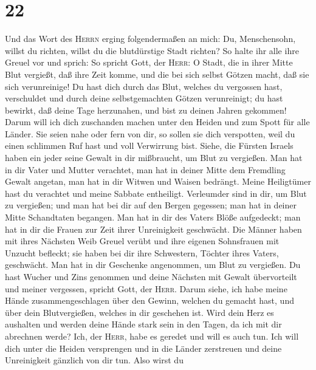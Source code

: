 \hypertarget{section-21}{%
\section{22}\label{section-21}}

 Und das Wort des \textsc{Herrn} erging folgendermaßen an
mich:  Du, Menschensohn, willst du richten, willst du die
blutdürstige Stadt richten? So halte ihr alle ihre Greuel vor und
sprich:  So spricht Gott, der \textsc{Herr}: O Stadt, die
in ihrer Mitte Blut vergießt, daß ihre Zeit komme, und die bei sich
selbst Götzen macht, daß sie sich verunreinige!  Du hast
dich durch das Blut, welches du vergossen hast, verschuldet und durch
deine selbstgemachten Götzen verunreinigt; du hast bewirkt, daß deine
Tage herzunahen, und bist zu deinen Jahren gekommen! Darum will ich dich
zuschanden machen unter den Heiden und zum Spott für alle Länder.
 Sie seien nahe oder fern von dir, so sollen sie dich
verspotten, weil du einen schlimmen Ruf hast und voll Verwirrung bist.
 Siehe, die Fürsten Israels haben ein jeder seine Gewalt
in dir mißbraucht, um Blut zu vergießen.  Man hat in dir
Vater und Mutter verachtet, man hat in deiner Mitte dem Fremdling Gewalt
angetan, man hat in dir Witwen und Waisen bedrängt.  Meine
Heiligtümer hast du verachtet und meine Sabbate entheiligt.
 Verleumder sind in dir, um Blut zu vergießen; und man hat
bei dir auf den Bergen gegessen; man hat in deiner Mitte Schandtaten
begangen.  Man hat in dir des Vaters Blöße aufgedeckt;
man hat in dir die Frauen zur Zeit ihrer Unreinigkeit geschwächt.
 Die Männer haben mit ihres Nächsten Weib Greuel verübt
und ihre eigenen Sohnsfrauen mit Unzucht befleckt; sie haben bei dir
ihre Schwestern, Töchter ihres Vaters, geschwächt.  Man
hat in dir Geschenke angenommen, um Blut zu vergießen. Du hast Wucher
und Zins genommen und deine Nächsten mit Gewalt übervorteilt und meiner
vergessen, spricht Gott, der \textsc{Herr}.  Darum siehe,
ich habe meine Hände zusammengeschlagen über den Gewinn, welchen du
gemacht hast, und über dein Blutvergießen, welches in dir geschehen ist.
 Wird dein Herz es aushalten und werden deine Hände stark
sein in den Tagen, da ich mit dir abrechnen werde? Ich, der
\textsc{Herr}, habe es geredet und will es auch tun.  Ich
will dich unter die Heiden versprengen und in die Länder zerstreuen und
deine Unreinigkeit gänzlich von dir tun.  Also wirst du
